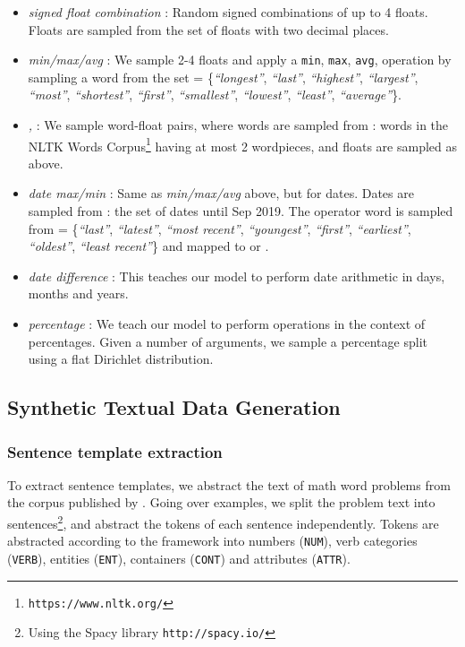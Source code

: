 \documentclass[11pt,a4paper]{article}
\newcommand\nl[1]{{\it``#1''}}
\begin{document}
\begin{itemize}[leftmargin=*,topsep=0pt,itemsep=-0.2em,topsep=0pt,parsep=0pt]
\item \emph{signed float combination} : Random signed combinations of up to 4 floats. Floats are sampled from the set of floats with two decimal places.

\item \emph{min/max/avg} :
We sample 2-4 floats and apply a \texttt{min}, \texttt{max}, \texttt{avg}, operation by sampling a word from the set  = \{\nl{longest}, \nl{last}, \nl{highest}, \nl{largest}, \nl{most}, \nl{shortest}, \nl{first}, \nl{smallest}, \nl{lowest}, \nl{least}, \nl{average}\}.

\item \emph{, }: 
We sample word-float pairs, where words are sampled from : words in the NLTK Words Corpus\footnote{\texttt{https://www.nltk.org/}} having at most 2 wordpieces, and floats are sampled as above.

\item \emph{date max/min} : Same as \emph{min/max/avg} above, but for dates. Dates are sampled from : the set of dates until Sep 2019. The operator word is sampled from  = \{\nl{last}, \nl{latest}, \nl{most recent}, \nl{youngest}, \nl{first}, \nl{earliest}, \nl{oldest}, \nl{least recent}\} and mapped to  or .

\item \emph{date difference} : This teaches our model to perform date arithmetic in days, months and years.

\item \emph{percentage} : We teach our model to perform  operations in the context of percentages. Given a number of arguments, we sample a percentage split using a flat Dirichlet distribution.
\end{itemize}


\subsection{Synthetic Textual Data Generation}
\label{section:textual_data_details}

\subsubsection{Sentence template extraction}
To extract sentence templates, we abstract the text of math word problems from the corpus published by \citet{hosseini2014learning}.
Going over examples, we split the problem text into sentences\footnote{Using the Spacy library \texttt{http://spacy.io/}}, and abstract the tokens of each sentence independently. Tokens are abstracted according to the framework into numbers (\texttt{NUM}), verb categories (\texttt{VERB}), entities (\texttt{ENT}), containers (\texttt{CONT}) and attributes (\texttt{ATTR}).
\end{document}
